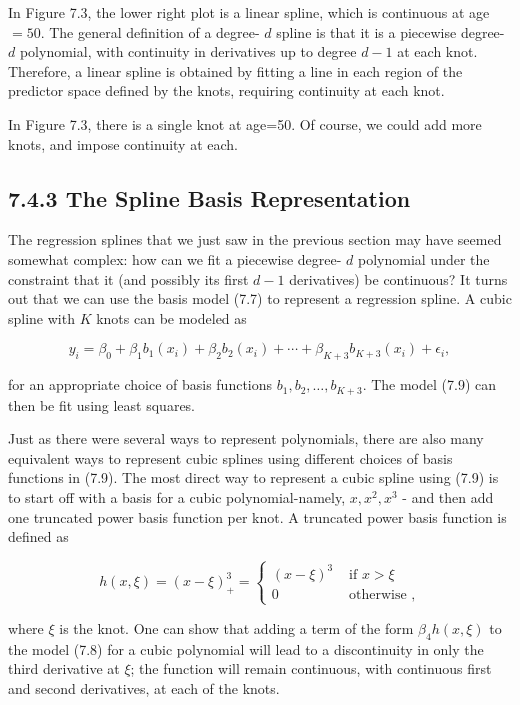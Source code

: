\documentclass[10pt]{article}
\begin{document}
In Figure 7.3, the lower right plot is a linear spline, which is continuous at age $=50$. The general definition of a degree- $d$ spline is that it is a piecewise degree- $d$ polynomial, with continuity in derivatives up to degree $d-1$ at each knot. Therefore, a linear spline is obtained by fitting a line in each region of the predictor space defined by the knots, requiring continuity at each knot.

In Figure 7.3, there is a single knot at age=50. Of course, we could add more knots, and impose continuity at each.

\subsection*{7.4.3 The Spline Basis Representation}
The regression splines that we just saw in the previous section may have seemed somewhat complex: how can we fit a piecewise degree- $d$ polynomial under the constraint that it (and possibly its first $d-1$ derivatives) be continuous? It turns out that we can use the basis model (7.7) to represent a regression spline. A cubic spline with $K$ knots can be modeled as


\begin{equation*}
y_{i}=\beta_{0}+\beta_{1} b_{1}\left(x_{i}\right)+\beta_{2} b_{2}\left(x_{i}\right)+\cdots+\beta_{K+3} b_{K+3}\left(x_{i}\right)+\epsilon_{i}, \tag{7.9}
\end{equation*}


for an appropriate choice of basis functions $b_{1}, b_{2}, \ldots, b_{K+3}$. The model (7.9) can then be fit using least squares.

Just as there were several ways to represent polynomials, there are also many equivalent ways to represent cubic splines using different choices of basis functions in (7.9). The most direct way to represent a cubic spline using (7.9) is to start off with a basis for a cubic polynomial-namely, $x, x^{2}, x^{3}$ - and then add one truncated power basis function per knot. A truncated power basis function is defined as

\[
h(x, \xi)=(x-\xi)_{+}^{3}=\left\{\begin{array}{cl}
(x-\xi)^{3} & \text { if } x>\xi  \tag{7.10}\\
0 & \text { otherwise },
\end{array}\right.
\]

where $\xi$ is the knot. One can show that adding a term of the form $\beta_{4} h(x, \xi)$ to the model (7.8) for a cubic polynomial will lead to a discontinuity in only the third derivative at $\xi$; the function will remain continuous, with continuous first and second derivatives, at each of the knots.
\end{document}
